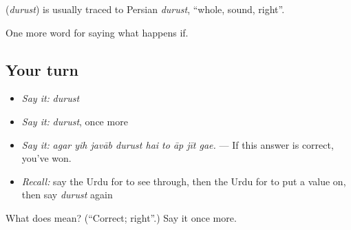 \begin{cousinweb}
\textbf{} (\emph{durust}) is usually traced to Persian \emph{durust}, \textquotedblleft{}whole, sound, right\textquotedblright{}.
\end{cousinweb}

\begin{grammarlens}[title={What you've built}]
One more word for saying what happens if.
\end{grammarlens}

\subsection*{Your turn}
\begin{itemize}
\raggedright
  \item \emph{Say it:} \emph{durust}
  \item \emph{Say it:} \emph{durust}, once more
  \item \emph{Say it:} \emph{agar yih javāb durust hai to āp jīt gae.} — If this answer is correct, you've won.
  \item \emph{Recall:} say the Urdu for to see through, then the Urdu for to put a value on, then say \emph{durust} again
\end{itemize}

\begin{tcolorbox}[breakable,colback=teal!4,colframe=teal!35!black,title={Before you move on}]
What does  mean? (\textquotedblleft{}Correct; right\textquotedblright{}.) Say it once more.
\end{tcolorbox}
